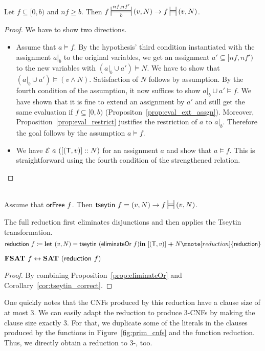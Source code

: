 \begin{proposition}
  Let $f \subseteq [0, b)$ and $nf \ge b$. 
  Then $f \Frepr{nf}{nf'}{b} (v, N) \rightarrow f \frepr{} (v, N)$. 
\end{proposition}
\begin{proof}
  We have to show two directions. 
  \begin{itemize}
    \item Assume that $a \models f$. By the hypothesis' third condition instantiated with the assignment $a|_b$ to the original variables, we get an assignment $a' \subseteq [nf, nf')$ to the new variables with $(a|_b \cup a') \models N$. We have to show that $(a|_b \cup a') \models (v \land N)$. Satisfaction of $N$ follows by assumption. By the fourth condition of the assumption, it now suffices to show $a|_b \cup a' \models f$. We have shown that it is fine to extend an assignment by $a'$ and still get the same evaluation if $f \subseteq [0, b)$ (Propositon~\ref{prop:eval_ext_assgn}).
      Moreover, Proposition~\ref{prop:eval_restrict} justifies the restriction of $a$ to $a|_b$. Therefore the goal follows by the assumption $a \models f$.
    \item We have $\mathcal{E}~a~([(\mathsf{T}, v)] :: N)$ for an assignment $a$ and show that $a \models f$. This is straightforward using the fourth condition of the strengthened relation.
  \end{itemize}
\end{proof}

\begin{corollary}\label{cor:tseytin_correct}~\\
  Assume that $\textsf{orFree}~f$. Then $\tseytin~f = (v, N) \rightarrow f \frepr{} (v, N)$. 
\end{corollary}

The full reduction first eliminates disjunctions and then applies the Tseytin transformation.
\[\textsf{reduction}~f \defeq \llet (v, N) = \tseytin~(\eliminateOr~f) \lin [(\btrue, v)] \concat N \mnote[reduction]{\textsf{reduction}}\]
\begin{lemma}
  $\textbf{FSAT}{}~f \leftrightarrow \textbf{SAT}{}~(\textsf{reduction}~f)$
\end{lemma}
\begin{proof}
  By combining Proposition~\ref{prop:eliminateOr} and Corollary~\ref{cor:tseytin_correct}.
\end{proof}

One quickly notes that the CNFs produced by this reduction have a clause size of at most 3. We can easily adapt the reduction to produce 3-CNFs by making the clause size exactly 3. For that, we duplicate some of the literals in the clauses produced by the functions in Figure~\ref{fig:prim_cnfs} and the function \textsf{reduction}.
Thus, we directly obtain a reduction to 3-\SAT{}, too.

